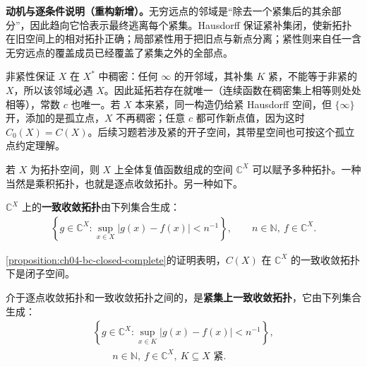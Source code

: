 \documentclass[../../main.tex]{subfiles}%
\begin{document}
\begin{remark}
\textbf{动机与逐条件说明（重构新增）。}无穷远点的邻域是“除去一个紧集后的其余部分”，因此趋向它恰表示最终逃离每个紧集。Hausdorff 保证紧补集闭，使新拓扑在旧空间上的相对拓扑正确；局部紧性用于把旧点与新点分离；紧性则来自任一含无穷远点的覆盖成员已经覆盖了紧集之外的全部点。

非紧性保证 $X$ 在 $X^*$ 中稠密：任何 $\infty$ 的开邻域，其补集 $K$ 紧，不能等于非紧的 $X$，所以该邻域必遇 $X$。因此延拓若存在就唯一（连续函数在稠密集上相等则处处相等），常数 $c$ 也唯一。若 $X$ 本来紧，同一构造仍给紧 Hausdorff 空间，但 $\{\infty\}$ 开，添加的是孤立点，$X$ 不再稠密；任意 $c$ 都可作新点值，因为这时 $C_0(X)=C(X)$。后续习题若涉及紧的开子空间，其带星空间也可按这个孤立点约定理解。
\end{remark}
若 $X$ 为拓扑空间，则 $X$ 上全体复值函数组成的空间 $\mathbb C^X$ 可以赋予多种拓扑。一种当然是乘积拓扑，也就是逐点收敛拓扑。另一种如下。
\begin{definition}[一致收敛拓扑]\label{definition:ch04-uniform-convergence-topology}
$\mathbb C^X$ 上的\textbf{一致收敛拓扑}由下列集合生成：
\begin{align*}
\left\{g\in\mathbb C^X:\sup_{x\in X}|g(x)-f(x)|<n^{-1}\right\},
\qquad n\in\mathbb N,\ f\in\mathbb C^X.
\end{align*}
\end{definition}
\begin{proposition}\label{proposition:ch04-continuous-uniform-closed}
\cref{proposition:ch04-bc-closed-complete}的证明表明，$C(X)$ 在 $\mathbb C^X$ 的一致收敛拓扑下是闭子空间。
\end{proposition}
\begin{definition}[紧集上一致收敛拓扑]\label{definition:ch04-compact-uniform-topology}
介于逐点收敛拓扑和一致收敛拓扑之间的，是\textbf{紧集上一致收敛拓扑}，它由下列集合生成：
\begin{align*}
\left\{g\in\mathbb C^X:\sup_{x\in K}|g(x)-f(x)|<n^{-1}\right\},\\
\qquad n\in\mathbb N,\ f\in\mathbb C^X,\ K\subseteq X\text{ 紧}.
\end{align*}
\end{definition}
\end{document}
